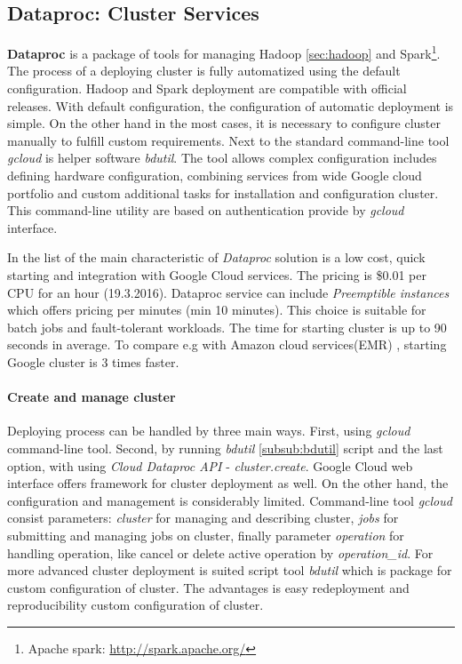 \documentclass[a4paper,12pt,oneside]{report}
\begin{document}
	
	
	\subsection{Dataproc: Cluster Services}
	\label{subsub:dataproc}
	\textbf{Dataproc} is a package of tools for managing Hadoop \ref{sec:hadoop} 
	and Spark\footnote{Apache spark: \url{http://spark.apache.org/}}.
	The process of a deploying cluster is fully automatized using the default 
	configuration. Hadoop and Spark deployment are compatible with official
	releases. With default configuration, the configuration of automatic deployment is simple. 
	On the other hand in the most cases, it is 
	necessary to configure cluster manually to fulfill custom requirements. 
	Next to the standard command-line tool \textit{gcloud} is 
	helper software \emph{bdutil}.  The tool  allows complex 
	configuration includes 
	defining hardware configuration, combining services from wide Google cloud 
	portfolio and custom additional tasks for installation and configuration
	cluster. 
	This command-line utility are based on authentication provide by \textit{gcloud}
	interface.
	
	In the list of the main characteristic of \textit{Dataproc} solution is a 
	low cost, quick starting and integration with Google Cloud services. 
	The pricing is  \$0.01 per CPU for an hour (19.3.2016). Dataproc service can 
	include \textit{Preemptible instances} which offers pricing 
	per minutes (min 10 minutes). This choice is suitable for batch jobs and 
	fault-tolerant workloads. The time for starting cluster is up to 
	90 seconds in average. To compare e.g with Amazon cloud
	services(EMR) \cite{amazon_emr}, starting Google cluster is 3 times faster.
	
	\paragraph{Create and manage cluster} Deploying process can be handled by three
	main ways. First, using \textit{gcloud} command-line tool. Second, by running
	\textit{bdutil} \ref{subsub:bdutil} script and the last option, with using 
	\textit{Cloud Dataproc API} - \textit{cluster.create}. Google Cloud web
	interface offers framework for cluster deployment as well. On the other hand,
	the configuration and management is considerably limited. Command-line tool
	\textit{gcloud} consist parameters: \textit{cluster} for managing and describing
	cluster, \textit{jobs} for submitting 	and managing jobs on cluster, finally parameter
	\textit{operation} for handling operation, like cancel or delete active 
	operation by \emph{operation\_id}. For more advanced cluster deployment is	
	suited script tool \textit{bdutil} which is 
	package for custom configuration of cluster. The advantages is easy
	redeployment and	reproducibility custom	configuration of cluster. 
	
\end{document}
